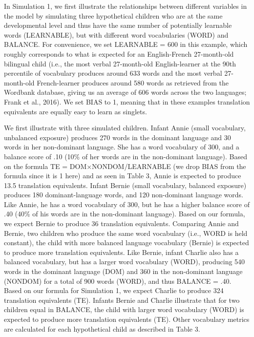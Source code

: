 \documentclass[
  english,
  ,man,floatsintext]{apa6}
\begin{document}
In Simulation 1, we first illustrate the relationships between different variables in the model by simulating three hypothetical children who are at the same developmental level and thus have the same number of potentially learnable words (LEARNABLE), but with different word vocabularies (WORD) and BALANCE. For convenience, we set LEARNABLE = 600 in this example, which roughly corresponds to what is expected for an English-French 27-month-old bilingual child (i.e., the most verbal 27-month-old English-learner at the 90th percentile of vocabulary produces around 633 words and the most verbal 27-month-old French-learner produces around 580 words as retrieved from the Wordbank database, giving us an average of 606 words across the two languages; Frank et al., 2016). We set BIAS to 1, meaning that in these examples translation equivalents are equally easy to learn as singlets.

We first illustrate with three simulated children. Infant Annie (small vocabulary, unbalanced exposure) produces 270 words in the dominant language and 30 words in her non-dominant language. She has a word vocabulary of 300, and a balance score of .10 (10\% of her words are in the non-dominant language). Based on the formula TE = DOM×NONDOM/LEARNABLE (we drop BIAS from the formula since it is 1 here) and as seen in Table 3, Annie is expected to produce 13.5 translation equivalents. Infant Bernie (small vocabulary, balanced exposure) produces 180 dominant-language words, and 120 non-dominant language words. Like Annie, he has a word vocabulary of 300, but he has a higher balance score of .40 (40\% of his words are in the non-dominant language). Based on our formula, we expect Bernie to produce 36 translation equivalents. Comparing Annie and Bernie, two children who produce the same word vocabulary (i.e., WORD is held constant), the child with more balanced language vocabulary (Bernie) is expected to produce more translation equivalents. Like Bernie, infant Charlie also has a balanced vocabulary, but has a larger word vocabulary (WORD), producing 540 words in the dominant language (DOM) and 360 in the non-dominant language (NONDOM) for a total of 900 words (WORD), and thus BALANCE = .40. Based on our formula for Simulation 1, we expect Charlie to produce 324 translation equivalents (TE). Infants Bernie and Charlie illustrate that for two children equal in BALANCE, the child with larger word vocabulary (WORD) is expected to produce more translation equivalents (TE). Other vocabulary metrics are calculated for each hypothetical child as described in Table 3.
\end{document}

